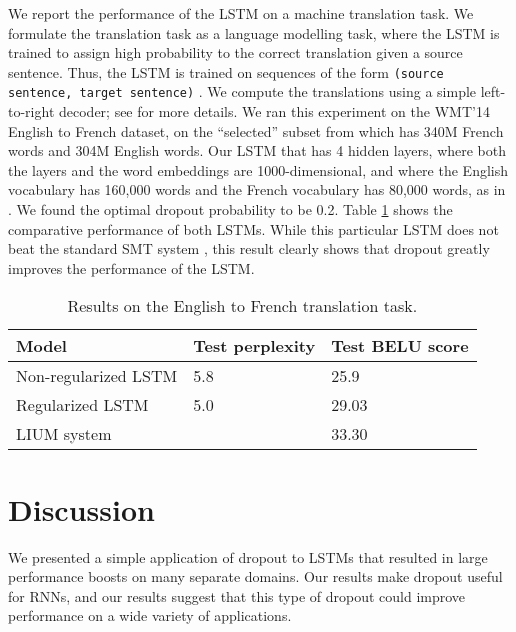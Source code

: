 \documentclass{article}
\begin{document}
We report the performance of the LSTM on a machine translation task.
We formulate the translation task as a language modelling task, where
the LSTM is trained to assign high probability to the correct
translation given a source sentence.  Thus, the LSTM is trained on
sequences of the form \texttt{(source sentence, target sentence)}
\cite{mt_paper,cho2014learning}. We compute the translations using a simple
left-to-right decoder; see \cite{mt_paper} for more details.  We ran
this experiment on the WMT'14 English to French dataset, on the
``selected'' subset from \cite{wmt_joint} which has 340M French words
and 304M English words.  Our LSTM that has 4 hidden layers, where both
the layers and the word embeddings are 1000-dimensional, and where the
English vocabulary has 160,000 words and the French vocabulary has
80,000 words, as in \cite{mt_paper}. We found the optimal dropout
probability to be 0.2.  Table \ref{tab:mt} shows the comparative
performance of both LSTMs.  While this particular LSTM does not beat
the standard SMT system \cite{lium}, this result clearly shows that
dropout greatly improves the performance of the LSTM.  

\begin{table}[t]
  \small
  \centering
  \renewcommand{\arraystretch}{1.15}
  \begin{tabular}{lll}
    \hline
     Model & Test perplexity & Test BELU score \\
    \hline
    Non-regularized LSTM & 5.8 & 25.9 \\
    Regularized LSTM & 5.0 &  29.03 \\
    \hline
    LIUM system &  &  33.30 \\
    \hline
  \end{tabular}
  \caption{Results on the English to French translation task. }
  \label{tab:mt}
\end{table}



\section{Discussion}

We presented a simple application of dropout to LSTMs that resulted in
large performance boosts on many separate domains.  Our results make dropout
useful for RNNs, and our results suggest that this type of dropout could improve
performance on a wide variety of applications.







\end{document}
